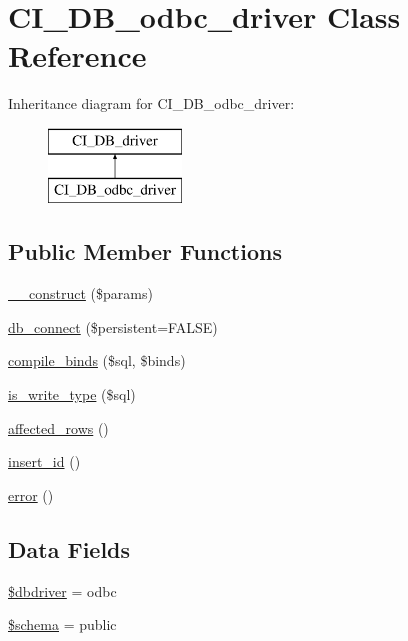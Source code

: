 \hypertarget{class_c_i___d_b__odbc__driver}{}\section{C\+I\+\_\+\+D\+B\+\_\+odbc\+\_\+driver Class Reference}
\label{class_c_i___d_b__odbc__driver}
Inheritance diagram for C\+I\+\_\+\+D\+B\+\_\+odbc\+\_\+driver\+:\begin{figure}[H]
\begin{center}
\leavevmode
\includegraphics[height=2.000000cm]{class_c_i___d_b__odbc__driver}
\end{center}
\end{figure}
\subsection*{Public Member Functions}
\begin{DoxyCompactItemize}
\item 
\mbox{\hyperlink{class_c_i___d_b__odbc__driver_a9162320adff1a1a4afd7f2372f753a3e}{\+\_\+\+\_\+construct}} (\$params)
\item 
\mbox{\hyperlink{class_c_i___d_b__odbc__driver_a52bf595e79e96cc0a7c907a9b45aeb4d}{db\+\_\+connect}} (\$persistent=F\+A\+L\+SE)
\item 
\mbox{\hyperlink{class_c_i___d_b__odbc__driver_a0ba381d2e9078472bd0167e75cc8033c}{compile\+\_\+binds}} (\$sql, \$binds)
\item 
\mbox{\hyperlink{class_c_i___d_b__odbc__driver_af435df5703c238769d6d16fde6d51182}{is\+\_\+write\+\_\+type}} (\$sql)
\item 
\mbox{\hyperlink{class_c_i___d_b__odbc__driver_a77248aaad33eb132c04cc4aa3f4bc8cb}{affected\+\_\+rows}} ()
\item 
\mbox{\hyperlink{class_c_i___d_b__odbc__driver_a933f2cde8dc7f87875e257d0a4902e99}{insert\+\_\+id}} ()
\item 
\mbox{\hyperlink{class_c_i___d_b__odbc__driver_a43b8d30b879d4f09ceb059b02af2bc02}{error}} ()
\end{DoxyCompactItemize}
\subsection*{Data Fields}
\begin{DoxyCompactItemize}
\item 
\mbox{\hyperlink{class_c_i___d_b__odbc__driver_a0cde2a16322a023d040aa7f725877597}{\$dbdriver}} = \textquotesingle{}odbc\textquotesingle{}
\item 
\mbox{\hyperlink{class_c_i___d_b__odbc__driver_a83022b1d70799d2bde3d64dca9cb40ee}{\$schema}} = \textquotesingle{}public\textquotesingle{}
\end{DoxyCompactItemize}
